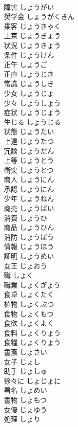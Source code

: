 \documentclass[8pt]{extreport}
\begin{document}
\begin{CJK}{UTF8}{min}
\\	障害	しょうがい	
\\	奨学金	しょうがくきん	
\\	乗客	じょうきゃく	
\\	上京	じょうきょう	
\\	状況	じょうきょう	
\\	条件	じょうけん	
\\	正午	しょうご	
\\	正直	しょうじき	
\\	常識	じょうしき	
\\	少女	しょうじょ	
\\	少々	しょうしょう	
\\	症状	しょうじょう	
\\	生じる	しょうじる	
\\	状態	じょうたい	
\\	上達	じょうたつ	
\\	冗談	じょうだん	
\\	上等	じょうとう	
\\	衝突	しょうとつ	
\\	商人	しょうにん	
\\	承認	しょうにん	
\\	少年	しょうねん	
\\	商売	しょうばい	
\\	消費	しょうひ	
\\	商品	しょうひん	
\\	消防	しょうぼう	
\\	情報	じょうほう	
\\	証明	しょうめい	
\\	女王	じょおう	
\\	職	しょく	
\\	職業	しょくぎょう	
\\	食卓	しょくたく	
\\	植物	しょくぶつ	
\\	食物	しょくもつ	
\\	食欲	しょくよく	
\\	食料	しょくりょう	
\\	食糧	しょくりょう	
\\	書斎	しょさい	
\\	女子	じょし	
\\	助手	じょしゅ	
\\	徐々に	じょじょに	
\\	署名	しょめい	
\\	書物	しょもつ	
\\	女優	じょゆう	
\\	処理	しょり	

\end{CJK}
\end{document}
